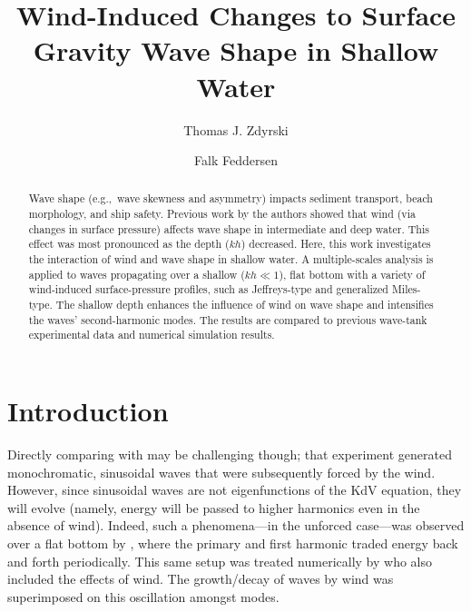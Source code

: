 \documentclass{jfm}
\title{Wind-Induced Changes to Surface Gravity Wave Shape in Shallow Water}
\author{Thomas J. Zdyrski \and Falk Feddersen}
\begin{document}
\maketitle

\begin{abstract}
Wave shape (e.g.,\ wave skewness and asymmetry) impacts sediment
transport, beach morphology, and ship safety.
Previous work by the authors showed that wind (via changes in surface
pressure) affects wave shape in intermediate and deep water.
This effect was most pronounced as the depth ($kh$) decreased.
Here, this work investigates the interaction of wind and wave shape in
shallow water.
A multiple-scales analysis is applied to waves propagating over a
shallow ($kh \ll 1$), flat bottom with a variety of wind-induced
surface-pressure profiles, such as Jeffreys-type and generalized
Miles-type.
The shallow depth enhances the influence of wind on wave shape and
intensifies the waves' second-harmonic modes.
The results are compared to previous wave-tank experimental data and
numerical simulation results.
\end{abstract}

\section{Introduction}
Directly comparing with \citet{feddersen2005wind} may be challenging
though; that experiment generated monochromatic, sinusoidal waves that
were subsequently forced by the wind.
However, since sinusoidal waves are not eigenfunctions of the KdV
equation, they will evolve (namely, energy will be passed to higher
harmonics even in the absence of wind).
Indeed, such a phenomena---in the unforced case---was observed over a
flat bottom by \citet{elgar1990recurrence,chapalain1992observed},
where the primary and first harmonic traded energy back and forth
periodically.
This same setup was treated numerically by \citet{liu2016modeling}
who also included the effects of wind.
The growth/decay of waves by wind was superimposed on this oscillation
amongst modes.
\end{document}
